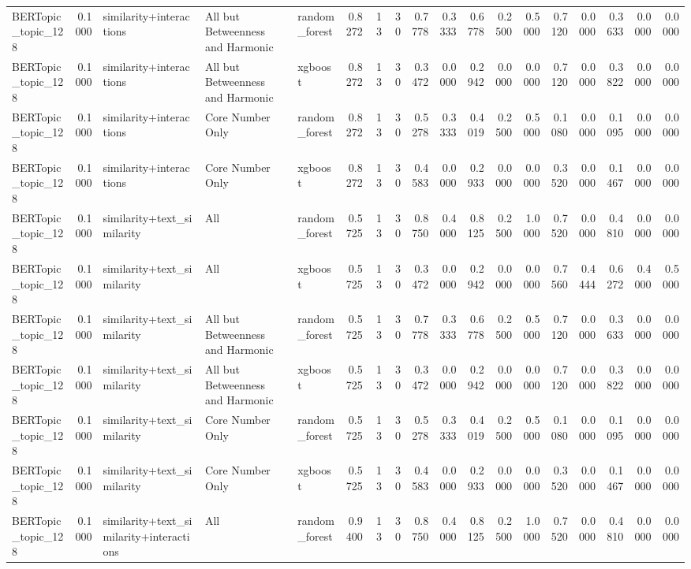 \begin{tabular}{lrlllrrrrrrrrrrrrr}
BERTopic_topic_128 & 0.1000 & similarity+interactions & All but Betweenness and Harmonic & random_forest & 0.8272 & 13 & 30 & 0.7778 & 0.3333 & 0.6778 & 0.2500 & 0.5000 & 0.7120 & 0.0000 & 0.3633 & 0.0000 & 0.0000 \\
BERTopic_topic_128 & 0.1000 & similarity+interactions & All but Betweenness and Harmonic & xgboost & 0.8272 & 13 & 30 & 0.3472 & 0.0000 & 0.2942 & 0.0000 & 0.0000 & 0.7120 & 0.0000 & 0.3822 & 0.0000 & 0.0000 \\
BERTopic_topic_128 & 0.1000 & similarity+interactions & Core Number Only & random_forest & 0.8272 & 13 & 30 & 0.5278 & 0.3333 & 0.4019 & 0.2500 & 0.5000 & 0.1080 & 0.0000 & 0.1095 & 0.0000 & 0.0000 \\
BERTopic_topic_128 & 0.1000 & similarity+interactions & Core Number Only & xgboost & 0.8272 & 13 & 30 & 0.4583 & 0.0000 & 0.2933 & 0.0000 & 0.0000 & 0.3520 & 0.0000 & 0.1467 & 0.0000 & 0.0000 \\
BERTopic_topic_128 & 0.1000 & similarity+text_similarity & All & random_forest & 0.5725 & 13 & 30 & 0.8750 & 0.4000 & 0.8125 & 0.2500 & 1.0000 & 0.7520 & 0.0000 & 0.4810 & 0.0000 & 0.0000 \\
BERTopic_topic_128 & 0.1000 & similarity+text_similarity & All & xgboost & 0.5725 & 13 & 30 & 0.3472 & 0.0000 & 0.2942 & 0.0000 & 0.0000 & 0.7560 & 0.4444 & 0.6272 & 0.4000 & 0.5000 \\
BERTopic_topic_128 & 0.1000 & similarity+text_similarity & All but Betweenness and Harmonic & random_forest & 0.5725 & 13 & 30 & 0.7778 & 0.3333 & 0.6778 & 0.2500 & 0.5000 & 0.7120 & 0.0000 & 0.3633 & 0.0000 & 0.0000 \\
BERTopic_topic_128 & 0.1000 & similarity+text_similarity & All but Betweenness and Harmonic & xgboost & 0.5725 & 13 & 30 & 0.3472 & 0.0000 & 0.2942 & 0.0000 & 0.0000 & 0.7120 & 0.0000 & 0.3822 & 0.0000 & 0.0000 \\
BERTopic_topic_128 & 0.1000 & similarity+text_similarity & Core Number Only & random_forest & 0.5725 & 13 & 30 & 0.5278 & 0.3333 & 0.4019 & 0.2500 & 0.5000 & 0.1080 & 0.0000 & 0.1095 & 0.0000 & 0.0000 \\
BERTopic_topic_128 & 0.1000 & similarity+text_similarity & Core Number Only & xgboost & 0.5725 & 13 & 30 & 0.4583 & 0.0000 & 0.2933 & 0.0000 & 0.0000 & 0.3520 & 0.0000 & 0.1467 & 0.0000 & 0.0000 \\
BERTopic_topic_128 & 0.1000 & similarity+text_similarity+interactions & All & random_forest & 0.9400 & 13 & 30 & 0.8750 & 0.4000 & 0.8125 & 0.2500 & 1.0000 & 0.7520 & 0.0000 & 0.4810 & 0.0000 & 0.0000 \\

\end{tabular}
